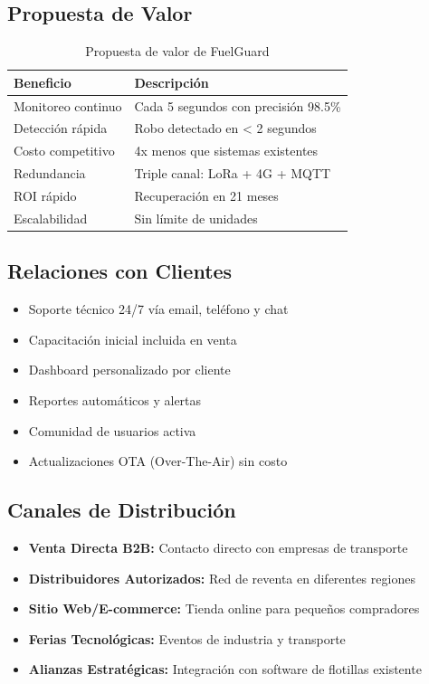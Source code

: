 \documentclass[12pt,a4paper,oneside]{report}
\begin{document}
\subsection{Propuesta de Valor}

\begin{table}[H]
    \centering
    \begin{tabular}{|l|l|}
        \hline
        \textbf{Beneficio} & \textbf{Descripción} \\
        \hline
        Monitoreo continuo & Cada 5 segundos con precisión 98.5\% \\
        Detección rápida & Robo detectado en < 2 segundos \\
        Costo competitivo & 4x menos que sistemas existentes \\
        Redundancia & Triple canal: LoRa + 4G + MQTT \\
        ROI rápido & Recuperación en 21 meses \\
        Escalabilidad & Sin límite de unidades \\
        \hline
    \end{tabular}
    \caption{Propuesta de valor de FuelGuard}
\end{table}

\subsection{Relaciones con Clientes}

\begin{itemize}
    \item Soporte técnico 24/7 vía email, teléfono y chat
    \item Capacitación inicial incluida en venta
    \item Dashboard personalizado por cliente
    \item Reportes automáticos y alertas
    \item Comunidad de usuarios activa
    \item Actualizaciones OTA (Over-The-Air) sin costo
\end{itemize}

\subsection{Canales de Distribución}

\begin{itemize}
    \item \textbf{Venta Directa B2B:} Contacto directo con empresas de transporte
    \item \textbf{Distribuidores Autorizados:} Red de reventa en diferentes regiones
    \item \textbf{Sitio Web/E-commerce:} Tienda online para pequeños compradores
    \item \textbf{Ferias Tecnológicas:} Eventos de industria y transporte
    \item \textbf{Alianzas Estratégicas:} Integración con software de flotillas existente
\end{itemize}
\end{document}
